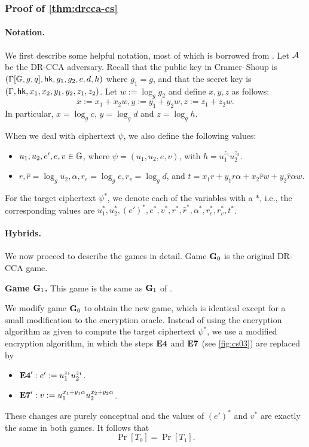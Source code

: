\subsubsection{Proof of \cref{thm:drcca-cs}}

\paragraph{Notation.} We first describe some helpful notation, most of which is borrowed from \cite{cs01}. Let $\mathcal{A}$ be the DR-CCA adversary. Recall that the public key in Cramer--Shoup is $(\Gamma[\mathbb{G},g,q],\mathsf{hk},g_1, g_2, c,d,h)$ where $g_1 = g$, and that the secret key is $(\Gamma,\mathsf{hk},x_1,x_2,y_1,y_2,z_1,z_2)$. Let $w:=\log_{g}g_2$ and define $x,y,z$ as follows: $$x:=x_1+x_2w, y:= y_1+y_2w, z:= z_1+z_2w.$$ In particular, $x=\log_{g}c$, $y=\log_gd$ and $z=\log_g h$.

When we deal with ciphertext $\psi$, we also define the following values:
\begin{itemize}
	\item $u_1,u_2,e',e,v\in\mathbb{G}$, where $\psi = (u_1,u_2,e,v)$, with $h = u_1^{z_1}u_2^{z_2}$.
	\item $r,\hat{r} = \log_gu_2, \alpha, r_e = \log_ge, r_v = \log_g d$, and $t = x_1r + y_1r\alpha + x_2\hat{r}w + y_2\hat{r}\alpha w$.
\end{itemize}

For the target ciphertext $\psi^{*}$, we denote each of the variables with a $*$, i.e., the corresponding values are $u_1^{*}, u_2^{*}, (e')^*, e^{*}, v^{*}, r^{*},\hat{r}^{*}, \alpha^{*}, r_e^{*}, r_v^{*}, t^{*}$.

\paragraph{Hybrids.} We now proceed to describe the games in detail. Game $\mathbf{G}_0$ is the original DR-CCA game.

\textbf{Game $\mathbf{G}_1$.} This game is the same as $\mathbf{G}_1$ of \cite{cs01}. 

We modify game $\mathbf{G}_0$ to obtain the new game, which is identical except for a small modification to the encryption oracle. Instead of using the encryption algorithm as given to compute the target ciphertext $\psi^{*}$, we use a modified encryption algorithm, in which the steps $\mathbf{E4}$ and $\mathbf{E7}$ (see \cref{fig:cs03}) are replaced by 
\begin{itemize}
	\item[] $\mathbf{E4}': e' := u_1^{z_1}u_2^{z_1}$. 
	\item[] $\mathbf{E7}': v := u_1^{x_1+y_1\alpha}u_2^{x_2+y_2\alpha}$.
\end{itemize}
These changes are purely conceptual and the values of $(e')^*$ and $v^{*}$ are exactly the same in both games. It follows that $$\Pr[T_0]=\Pr[T_1].$$

